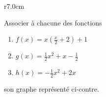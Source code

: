 
\begin{exercice}\label{exosmath-0271}

\begin{wrapfigure}{r}{7.0cm}
   \vspace{-3.5cm}        %
   \centering
   
\end{wrapfigure}

Associer à chacune des fonctions 
\begin{enumerate}
    \item
\( f(x)=x\left( \frac{ x }{2}+2 \right)+1\)
\item
\( g(x)=\frac{ 1 }{2}x^2+x-\frac{ 1 }{2}\)
\item
\( h(x)=-\frac{ 1 }{2}x^2+2x\)
\end{enumerate}
son graphe représenté ci-contre.

\end{exercice}
